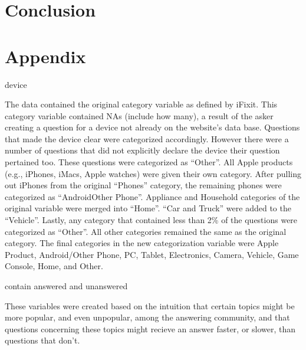 \documentclass[12pt]{article}
\begin{document}
\section{Conclusion}




\section{Appendix} 

device

The data contained the original category variable as defined by iFixit. This category variable contained NAs (include how many), a result of the asker creating a question for a device not already on the website's data base. Questions that made the device clear were categorized accordingly. However there were a number of questions that did not explicitly declare the device their question pertained too. These questions were categorized as ``Other''. All Apple products (e.g., iPhones, iMacs, Apple watches) were given their own category. After pulling out iPhones from the original ``Phones'' category, the remaining phones were categorized as ``AndroidOther Phone''. Appliance and Household categories of the original variable were merged into ``Home''. ``Car and Truck'' were added to the ``Vehicle''. Lastly, any category that contained less than 2\% of the questions were categorized as ``Other''. All other categories remained the same as the original category. The final categories in the new categorization variable were Apple Product, Android/Other Phone, PC, Tablet, Electronics, Camera, Vehicle, Game Console, Home, and Other. 

contain answered and unanswered

  These variables were created based on the intuition that certain topics might be more popular, and even unpopular, among the answering community, and that questions concerning these topics might recieve an answer faster, or slower, than questions that don't. 
  
\end{document}
